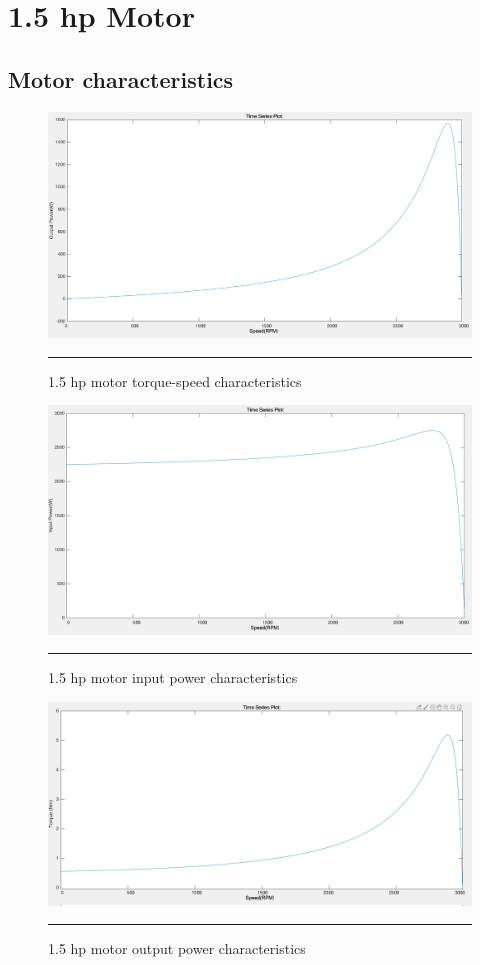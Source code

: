 \clearpage
\section{1.5 hp Motor}
\subsection{Motor characteristics}

\begin{figure}[hbtp!]
	\centering
		\includegraphics[width = 4.5in]{./Figures/MS/fig512.png}
		\rule{35em}{0.5pt}
	\caption{1.5 hp motor torque-speed characteristics}
	\label{fig:1.5 hp motor torque-speed characteristics} 
\end{figure}

\begin{figure}[hbtp!]
	\centering
		\includegraphics[width = 4.5in]{./Figures/MS/fig513.png}
		\rule{35em}{0.5pt}
	\caption{1.5 hp motor input power characteristics}
	\label{fig:1.5 hp motor input power characteristics} 
\end{figure}

\begin{figure}[hbtp!]
	\centering
		\includegraphics[width = 4.5in]{./Figures/MS/fig514.png}
		\rule{35em}{0.5pt}
	\caption{1.5 hp motor output power characteristics}
	\label{fig:1.5 hp motor output power characteristics} 
\end{figure}

